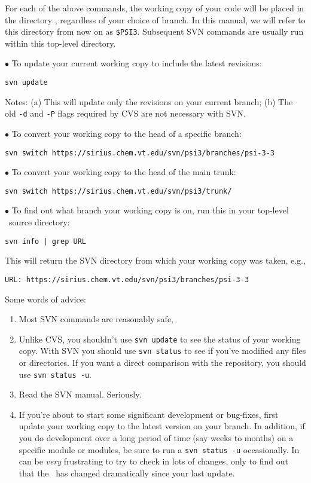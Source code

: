 \noindent For each of the above commands, the working copy of your
code will be placed in the directory , regardless of your
choice of branch.  In this manual, we will refer to this directory
from now on as {\tt \$PSI3}.  Subsequent SVN commands are usually run
within this top-level directory.

\noindent
$\bullet$ To update your current working copy to include the latest revisions:

{\tt svn update}

\noindent
Notes: (a) This will update only the revisions on your current branch;
(b) The old {\tt -d} and {\tt -P} flags required by CVS are not necessary with SVN. 

\noindent
$\bullet$ To convert your working copy to the head of a specific branch:

{\tt svn switch https://sirius.chem.vt.edu/svn/psi3/branches/psi-3-3}

\noindent
$\bullet$ To convert your working copy to the head of the main trunk:

{\tt svn switch https://sirius.chem.vt.edu/svn/psi3/trunk/}

\noindent
$\bullet$ To find out what branch your working copy is on, run this in your
top-level \PSIthree\ source directory:

{\tt svn info | grep URL}

\noindent
This will return the SVN directory from which your working copy was
taken, e.g.,

\noindent
{\tt URL: https://sirius.chem.vt.edu/svn/psi3/branches/psi-3-3}

\noindent
Some words of advice:
\begin{enumerate}
\item Most SVN commands are reasonably safe, 

\item Unlike CVS, you shouldn't use {\tt svn update} to see the status
  of your working copy.  With SVN you should use {\tt svn status} to
  see if you've modified any files or directories.  If you want a
  direct comparison with the repository, you should use {\tt svn status -u}.
\item Read the SVN manual.  Seriously.
\begin{center}
\end{center}
\item If you're about to start some significant development or bug-fixes,
first update your working copy to the latest version on your branch.
In addition, if you do development over a long period of time (say weeks to
months) on a specific module or modules, be sure to run a {\tt svn status -u}
occasionally. In can be {\em very} frustrating to try to check in lots
of changes, only to find out that the \PSIthree\ has changed dramatically
since your last update.
\end{enumerate}

